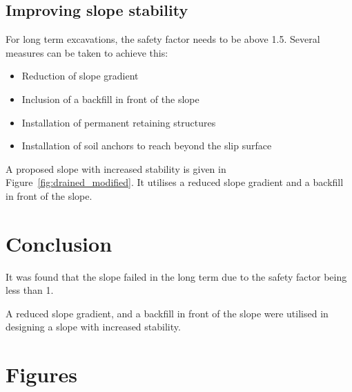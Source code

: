 \documentclass[a4paper]{article}
\begin{document}
\subsection{Improving slope stability}

For long term excavations, the safety factor needs to be above 1.5. Several measures can be taken to achieve this:

\begin{itemize}
\item Reduction of slope gradient
\item Inclusion of a backfill in front of the slope
\item Installation of permanent retaining structures
\item Installation of soil anchors to reach beyond the slip surface
\end{itemize}

A proposed slope with increased stability is given in 
Figure~\ref{fig:drained_modified}. 
It utilises a reduced slope gradient and a backfill in front of the slope.


\section{Conclusion}

It was found that the slope failed in the long term due to the safety factor being less than 1.

A reduced slope gradient, and a backfill in front of the slope were utilised
in designing a slope with increased stability. 


\section*{Figures}
\end{document}
